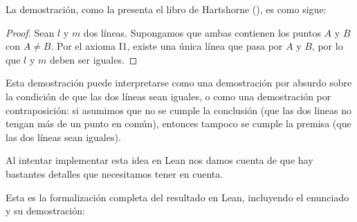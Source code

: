 
La demostración, como la presenta el libro de Hartshorne (), es como
sigue:
\begin{proof}
	Sean $l$ y $m$ dos líneas. Supongamos que ambas contienen los puntos $A$ y
	$B$ con $A\ne B$. Por el axioma I1, existe una única línea que pasa por $A$
	y $B$, por lo que $l$ y $m$ deben ser iguales.
\end{proof}

Esta demostración puede interpretarse como una demostración por absurdo sobre la
condición de que las dos líneas sean iguales, o como una demostración por
contraposición: si asumimos que no se cumple la conclusión (que las dos lineas
no tengan más de un punto en común), entonces tampoco se cumple la premisa (que las
dos líneas sean iguales).


Al intentar implementar esta idea en Lean nos damos cuenta de que hay bastantes
detalles que necesitamos tener en cuenta.

Esta es la formalización completa del resultado en Lean, incluyendo el enunciado
y su demostración:



